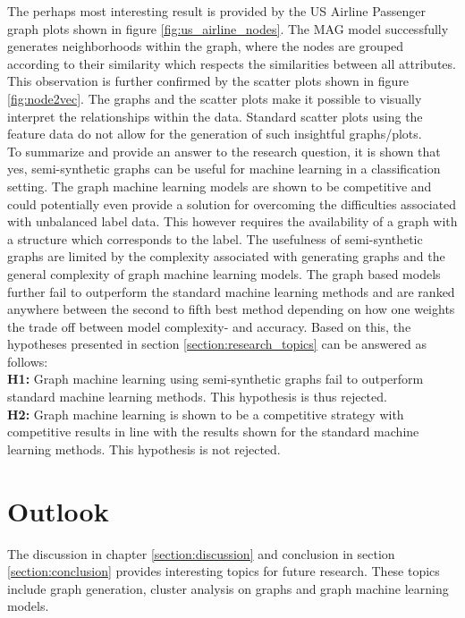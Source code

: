   \noindent The perhaps most interesting result is provided by the US Airline
  Passenger graph plots shown in figure \ref{fig:us_airline_nodes}. The MAG 
  model successfully generates neighborhoods within the graph, where the nodes 
  are grouped according to their similarity which respects the similarities 
  between all attributes. This observation is further confirmed by the scatter 
  plots shown in figure \ref{fig:node2vec}. The graphs and the scatter plots
  make it possible to visually interpret the relationships within the data. 
  Standard scatter plots using the feature data do not allow for the generation 
  of such insightful graphs/plots. \\

  \noindent To summarize and provide an answer to the research question, it is
  shown that yes, semi-synthetic graphs can be useful for machine learning in a
  classification setting. The graph machine learning models are shown to be 
  competitive and could potentially even provide a solution for overcoming the 
  difficulties associated with unbalanced label data. This however requires the 
  availability of a graph with a structure which corresponds to the label. The 
  usefulness of semi-synthetic graphs are limited by the complexity associated 
  with generating graphs and the general complexity of graph machine learning 
  models. The graph based models further fail to outperform the standard machine 
  learning methods and are ranked anywhere between the second to fifth best 
  method depending on how one weights the trade off between model complexity- 
  and accuracy. Based on this, the hypotheses presented in section
  \ref{section:research_topics} can be answered as follows: \\

  \noindent\textbf{H1:} Graph machine learning using semi-synthetic graphs fail
  to outperform standard machine learning methods. This hypothesis is thus
  rejected. \\

  \noindent\textbf{H2:} Graph machine learning is shown to be a competitive
  strategy with competitive results in line with the results shown for the
  standard machine learning methods. This hypothesis is not rejected.

  \section{Outlook}

  The discussion in chapter \ref{section:discussion} and conclusion in section
  \ref{section:conclusion} provides interesting topics for future research.
  These topics include graph generation, cluster analysis on graphs and graph 
  machine learning models. 

